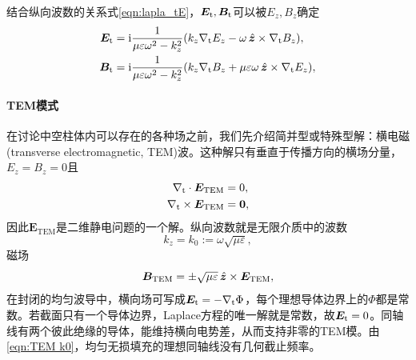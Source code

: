 结合纵向波数的关系式\eqref{eqn:lapla_tE}，$\bm E_\mathrm t,\bm B_\mathrm t$可以被$E_z,B_z$确定
\begin{subequations}
    \label{eqn:EtBt=EzBz}
    \begin{align}
        \label{eqn:Et=EzBz}
        \bm E_\mathrm t &= \mathrm{i}\frac1{\mu\varepsilon\omega^2 - k_z^2}(k_z\nabla_\mathrm t E_z - \omega\mathop{}\!\hat{\bm{z}} \times \nabla_\mathrm t B_z),\\
        \label{eqn:Bt=EzBz}
        \bm B_\mathrm t &= \mathrm{i}\frac1{\mu\varepsilon\omega^2 - k_z^2}(k_z\nabla_\mathrm t B_z + \mu\varepsilon\omega\mathop{}\!\hat{\bm{z}} \times \nabla_\mathrm t E_z),
    \end{align}
\end{subequations}

\paragraph{TEM模式}

在讨论中空柱体内可以存在的各种场之前，我们先介绍简并型或特殊型解：横电磁(transverse electromagnetic, TEM)波。这种解只有垂直于传播方向的横场分量，$E_z = B_z = 0$且
\begin{subequations}
    \begin{align}
        \nabla_\mathrm t \cdot \bm E_\mathrm{TEM} &= 0,\\
        \nabla_\mathrm t \times \bm E_\mathrm{TEM} &= \bm 0,
    \end{align}
\end{subequations}
因此$\bm E_\mathrm{TEM}$是二维静电问题的一个解。纵向波数就是无限介质中的波数
\begin{equation}
    \label{eqn:TEM k0}
    k_z = k_0 := \omega\sqrt{\mu\varepsilon},
\end{equation}
磁场 
\begin{equation}
    \label{eq:ed-tem-field-impedance}
    \bm B_\mathrm{TEM} = \pm\sqrt{\mu\varepsilon}\mathop{}\!\hat{\bm{z}} \times \bm E_\mathrm{TEM},
\end{equation}
在封闭的均匀波导中，横向场可写成$\bm E_\mathrm t = -\nabla_\mathrm t\Phi$，每个理想导体边界上的$\Phi$都是常数。若截面只有一个导体边界，Laplace方程的唯一解就是常数，故$\bm E_\mathrm t = 0$。同轴线有两个彼此绝缘的导体，能维持横向电势差，从而支持非零的TEM模。由\eqref{eqn:TEM k0}，均匀无损填充的理想同轴线没有几何截止频率。

